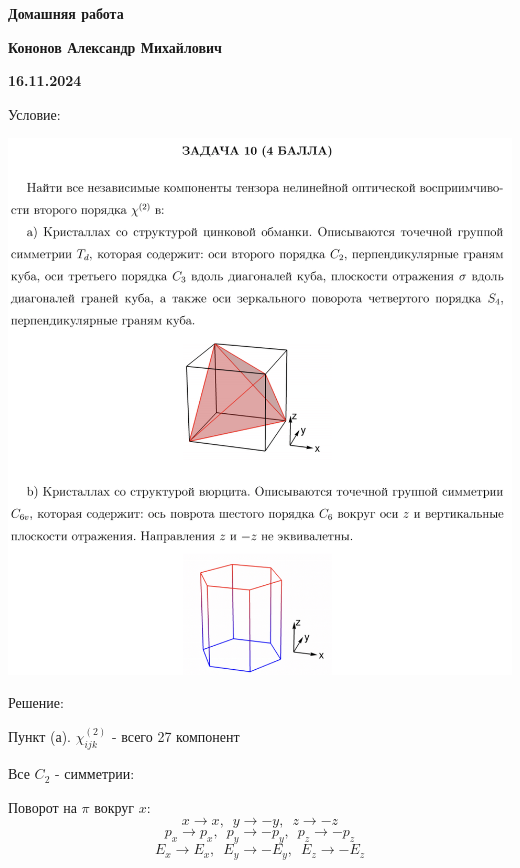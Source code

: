 \documentclass[12pt]{article}
\begin{document}
\begin{large}
\begin{center}
\LARGE \textbf{Домашняя работа}
\par
\LARGE \textbf{Кононов Александр Михайлович}
\par
    \textbf{16.11.2024}
\end{center}
\par Условие:
\par
\includegraphics[width=1\textwidth]{photo.png}
\par Решение:
\par
\par Пункт (а). $\chi_{ijk}^{(2)}$ - всего 27 компонент
\par Все $C_2$ - симметрии:
\par Поворот на $\pi$ вокруг $x$:
\[
    x \rightarrow x, \,\,\, y \rightarrow -y, \,\,\, z \rightarrow -z
\]
\[
    p_x \rightarrow p_x, \,\,\, p_y \rightarrow -p_y, \,\,\, p_z \rightarrow -p_z
\]
\[
    E_x \rightarrow E_x, \,\,\, E_y \rightarrow -E_y, \,\,\, E_z \rightarrow -E_z
\]
\end{large}
\end{document}
